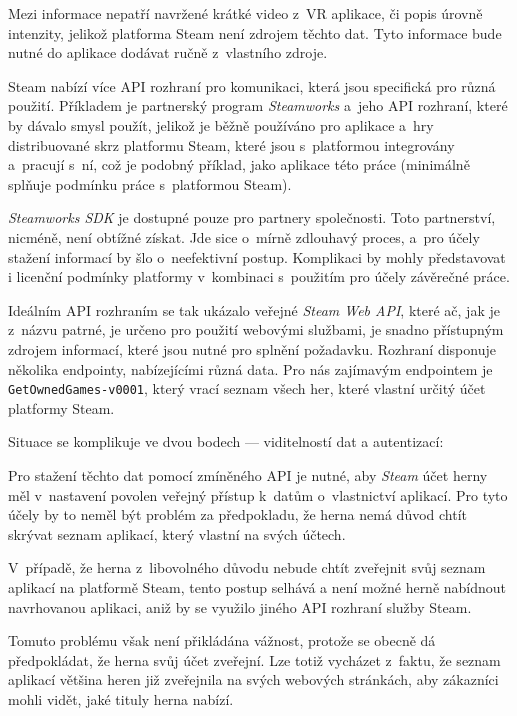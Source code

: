 Mezi informace nepatří navržené krátké video z~VR aplikace, či popis úrovně
intenzity, jelikož platforma Steam není zdrojem těchto dat. Tyto
informace bude nutné do aplikace dodávat ručně z~vlastního zdroje.

Steam nabízí více API rozhraní pro komunikaci, která jsou specifická pro různá
použití. Příkladem je partnerský program \emph{Steamworks} a~jeho API rozhraní, 
které by dávalo smysl použít, jelikož je
běžně používáno pro aplikace a~hry distribuované skrz platformu Steam,
které jsou s~platformou integrovány a~pracují s~ní, což je podobný příklad, jako aplikace této práce (minimálně splňuje podmínku práce
s~platformou Steam). \autocite{steamworks}

\emph{Steamworks SDK} je dostupné pouze pro
partnery společnosti. Toto partnerství, nicméně, není obtížné získat.
Jde sice o~mírně zdlouhavý proces, a~pro účely stažení informací by šlo
o~neefektivní postup. Komplikaci by mohly představovat i licenční podmínky
platformy v~kombinaci s~použitím pro účely závěrečné práce.

Ideálním API rozhraním se tak ukázalo veřejné \emph{Steam Web API},
které ač, jak je z~názvu patrné, je určeno pro použití webovými
službami, je snadno přístupným zdrojem informací, které jsou
nutné pro splnění požadavku. \autocite{steamwebapi} Rozhraní disponuje několika endpointy,
nabízejícími různá data. Pro nás zajímavým endpointem je
\texttt{GetOwnedGames-v0001}, který vrací seznam všech her, které
vlastní určitý účet platformy Steam.

Situace se komplikuje ve dvou bodech --- viditelností dat a
autentizací:

Pro stažení těchto dat pomocí zmíněného API je nutné, aby \emph{Steam} 
účet herny měl v~nastavení povolen veřejný přístup
k~datům o~vlastnictví aplikací. Pro tyto účely by to neměl být problém za
předpokladu, že herna nemá důvod chtít skrývat seznam aplikací, který vlastní
na svých účtech. 

V~případě, že herna z~libovolného důvodu nebude chtít
zveřejnit svůj seznam aplikací na platformě Steam, tento postup  selhává a
není možné herně nabídnout navrhovanou aplikaci, aniž by se využilo
jiného API rozhraní služby Steam. 

Tomuto problému však není přikládána
vážnost, protože se obecně dá předpokládat, že herna svůj účet zveřejní.
Lze totiž vycházet z~faktu, že seznam aplikací většina heren již zveřejnila
na svých webových stránkách, aby zákazníci mohli vidět, jaké tituly
herna nabízí.

